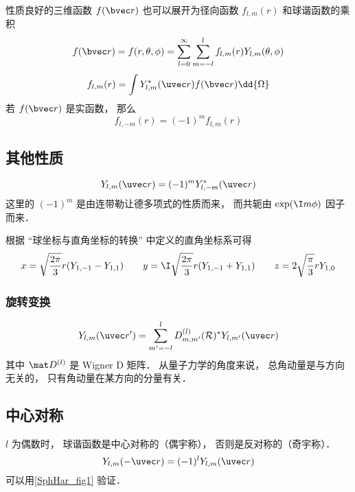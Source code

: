 性质良好的三维函数 $f(\bvec r)$ 也可以展开为径向函数 $f_{l,m}(r)$ 和球谐函数的乘积
\begin{equation}
f(\bvec r) = f(r, \theta, \phi) = \sum_{l = 0}^\infty\sum_{m=-l}^l f_{l,m}(r) Y_{l,m}(\theta, \phi)
\end{equation}
\begin{equation}
f_{l,m}(r) = \int Y^*_{l,m}(\uvec r) f(\bvec r) \dd{\Omega}
\end{equation}
若 $f(\bvec r)$ 是实函数， 那么
\begin{equation}
f_{l,-m}(r) = (-1)^m f_{l,m}(r)
\end{equation}

\subsection{其他性质}
\begin{equation}\label{SphHar_eq6}
Y_{l,m}(\uvec r) = (-1)^m Y_{l,-m}^*(\uvec r)
\end{equation}
这里的 $(-1)^m$ 是由连带勒让德多项式的性质而来， 而共轭由 $\exp(\I m\phi)$ 因子而来．

根据 “球坐标与直角坐标的转换” 中定义的直角坐标系可得
\begin{equation}\label{SphHar_eq4}
x = \sqrt{\frac{2\pi}{3}} r (Y_{1,-1} - Y_{1,1}) \qquad
y = \I \sqrt{\frac{2\pi}{3}} r (Y_{1,-1}+Y_{1,1}) \qquad
z =2\sqrt{\frac{\pi}{3}} rY_{1,0}
\end{equation}

\subsubsection{旋转变换}
\begin{equation}
Y_{l,m}(\uvec r') = \sum_{m'=-l}^l D_{m,m'}^{(l)} (\mathcal R)^* Y_{l,m'}(\uvec r)
\end{equation}
其中 $\mat D^{(l)}$ 是 Wigner D 矩阵． 从量子力学的角度来说， 总角动量是与方向无关的， 只有角动量在某方向的分量有关．

\subsection{中心对称}
$l$ 为偶数时， 球谐函数是中心对称的（偶宇称）， 否则是反对称的（奇宇称）．
\begin{equation}\label{SphHar_eq8}
Y_{l,m}(-\uvec r) = (-1)^l Y_{l,m}(\uvec r)
\end{equation}
可以用\autoref{SphHar_fig1} 验证．

